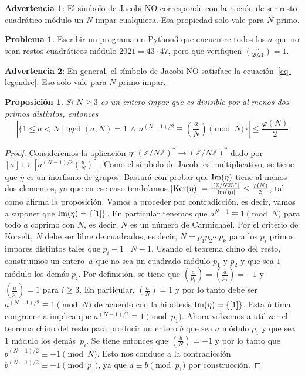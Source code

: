 \documentclass[a4paper, 11pt]{article}
\newcommand{\ZZ}{\mathbb{Z}}
\newcounter{numerodetema}
\theoremstyle{plain}
\newtheorem{prop}[teor]{Proposición}
\theoremstyle{definition}
\newtheorem{prob}{Problema}[numerodetema]
\begin{document}
{\bf Advertencia 1}: El símbolo de Jacobi NO corresponde con la noción de ser
resto cuadrático módulo un $N$ impar cualquiera. Esa propiedad solo vale
para $N$ primo.

\begin{prob}
Escribir un programa en Python3 que encuentre todos los $a$ que no sean
restos cuadráticos módulo $2021=43\cdot47$, pero que verifiquen
$\left(\frac{a}{2021}\right)=1$.
\end{prob}

{\bf Advertencia 2}: En general, el símbolo de Jacobi NO satisface la
ecuación~\eqref{eq-legendre}. Eso solo vale para $N$ primo impar.

\begin{prop}\label{prop-euler-jacobi}
Si $N\geq 3$ es un entero impar que es divisible por al menos dos
primos distintos, entonces
\[
\left|\{1\leq a<N\mid \gcd(a,N)=1\,\wedge\,a^{(N-1)/2}\equiv
\left(\frac{a}{N}\right)\pmod{N}\}\right|\leq\frac{\varphi(N)}2
\]
\end{prop}
\begin{proof}
Consideremos la aplicación $\eta:(\ZZ/N\ZZ)^*\rightarrow(\ZZ/N\ZZ)^*$
dado por $[a]\mapsto \left[a^{(N-1)/2}\left(\frac{a}{N}\right)\right]$.
Como el símbolo de Jacobi es multiplicativo, se tiene que $\eta$ es un
morfismo de grupos. Bastará con probar que ${\rm Im}(\eta)$ tiene al
menos dos elementos, ya que en ese caso tendríamos $|{\rm Ker}(\eta)|=
\frac{|(\ZZ/N\ZZ)^*|}{|{\rm Im}(\eta)|}\leq\frac{\varphi(N)}2$, tal
como afirma la proposición. Vamos a proceder por contradicción, es
decir, vamos a suponer que ${\rm Im}(\eta)=\{[1]\}$. En particular tenemos
que $a^{N-1}\equiv1\pmod{N}$ para todo $a$ coprimo con $N$, es decir,
$N$ es un número de Carmichael. Por el criterio de Korselt, $N$ debe ser
libre de cuadrados, es decir, $N=p_1p_2\cdots p_k$ para los $p_i$ primos
impares distintos tales que
$p_i-1\mid N-1$. Usando el teorema chino del resto, construimos un entero~$a$
que no sea un cuadrado módulo $p_1$ y $p_2$ y que sea $1$ módulo los
demás $p_i$. Por definición, se tiene que $\left(\frac{a}{p_1}\right)=
\left(\frac{a}{p_2}\right)=-1$ y $\left(\frac{a}{p_i}\right)=1$ para
$i\geq 3$. En particular, $\left(\frac{a}{N}\right)=1$ y
por lo tanto debe ser $a^{(N-1)/2}\equiv 1\pmod{N}$ de acuerdo con la
hipótesis ${\rm Im}(\eta)=\{[1]\}$. Esta última
congruencia implica que $a^{(N-1)/2}\equiv1\pmod{p_1}$. Ahora volvemos
a utilizar el teorema chino del resto para producir un entero $b$
que sea $a$ módulo $p_1$ y que sea $1$ módulo los demás~$p_i$.
Se tiene entonces que $\left(\frac{b}{N}\right)=-1$ y por lo tanto
que $b^{(N-1)/2}\equiv-1\pmod{N}$. Esto nos conduce a la contradicción
$b^{(N-1)/2}\equiv-1\pmod{p_1}$, ya que $a\equiv b\pmod{p_1}$ por
construcción.
\end{proof}
\end{document}
